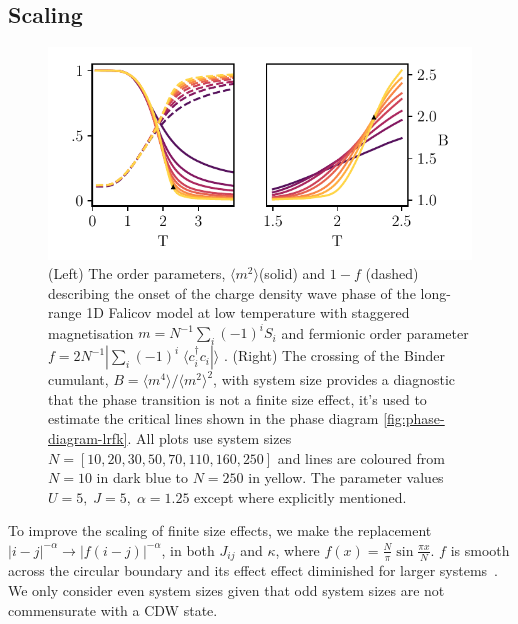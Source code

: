 \hypertarget{scaling}{%
\subsection{Scaling}\label{scaling}}

\hypertarget{fig:binder_cumulants}{%
\begin{figure}
\centering
\includegraphics[width=1\textwidth,height=\textheight]{figure_code/fk_chapter/binder_cumulants/binder_cumulants}
\caption[{Binder Cumulants}]{(Left) The order parameters, \(\langle m^2 \rangle\)(solid) and \(1 - f\) (dashed) describing the onset of the charge density wave phase of the long-range 1D Falicov model at low temperature with staggered magnetisation \(m = N^{-1} \sum_i (-1)^i S_i\) and fermionic order parameter \(f = 2 N^{-1}|\sum_i (-1)^i \; \langle c^\dagger_{i}c_{i}| \rangle\) . (Right) The crossing of the Binder cumulant, \(B = \langle m^4 \rangle / \langle m^2 \rangle^2\), with system size provides a diagnostic that the phase transition is not a finite size effect, it's used to estimate the critical lines shown in the phase diagram \cref{fig:phase-diagram-lrfk}. All plots use system sizes \(N = [10,20,30,50,70,110,160,250]\) and lines are coloured from \(N = 10\) in dark blue to \(N = 250\) in yellow. The parameter values \(U = 5,\;J = 5,\;\alpha = 1.25\) except where explicitly mentioned.}
\label{fig:binder_cumulants}
\end{figure}
}

To improve the scaling of finite size effects, we make the replacement \(|i - j|^{-\alpha} \rightarrow |f(i - j)|^{-\alpha}\), in both \(J_{ij}\) and \(\kappa\), where \(f(x) = \frac{N}{\pi}\sin \frac{\pi x}{N}\). \(f\) is smooth across the circular boundary and its effect effect diminished for larger systems~\autocite{fukuiOrderNClusterMonte2009}. We only consider even system sizes given that odd system sizes are not commensurate with a CDW state.


